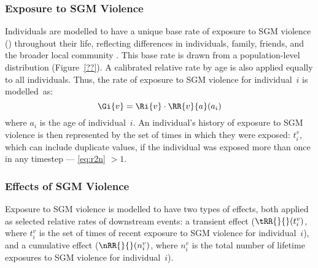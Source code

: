 \subsubsection{Exposure to SGM Violence}\label{mod.par.evt.vex}
Individuals are modelled to have
a unique base rate of exposure to SGM violence () throughout their life,
reflecting differences in individuals, family, friends, and the broader local community
\cite{??}.
This base rate is drawn from a population-level distribution (Figure~\ref{??}).
A calibrated relative rate by age
 is also applied equally to all individuals.
Thus, the rate of
exposure to SGM violence for individual~$i$ is modelled~as:
\begin{equation}
  \Gi{v} = \Ri{v} \cdot \RR{v}{a}(a_i)
\end{equation}
where $a_i$ is the age of individual~$i$.
An individual's history of exposure to SGM violence
is then represented by the set of times in which they were exposed: $t^v_i$,
which can include duplicate values,
if the individual was exposed more than once in any timestep
--- \ie \eqref{eq:r2n} $> 1$.
\subsubsection{Effects of SGM Violence}\label{mod.par.evt.vef}
Exposure to SGM violence is modelled to have two types of effects,
both applied as selected relative rates of downstream events:
a transient effect ($\tRR{}{}(t^v_i)$, where
$t^v_i$ is the set of times of recent exposure to SGM violence for individual~$i$), and
a cumulative effect ($\nRR{}{}(n^v_i)$, where
$n^v_i$ is the total number of lifetime exposures to SGM violence for individual~$i$).
